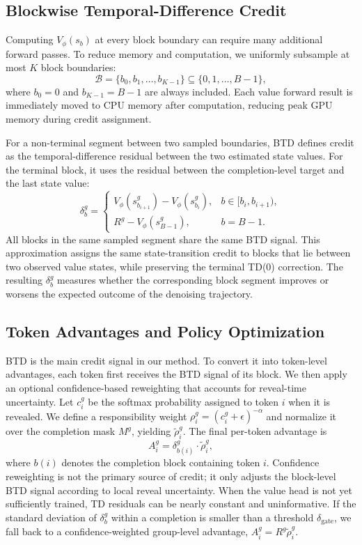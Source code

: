 \documentclass[letterpaper]{article}
\begin{document}
\subsection{Blockwise Temporal-Difference Credit}

Computing $V_\phi(s_b)$ at every block boundary can require many additional forward passes. To reduce memory and computation, we uniformly subsample at most $K$ block boundaries:
\begin{equation}
 \mathcal{B}=\{b_0,b_1,\ldots,b_{K-1}\}\subseteq\{0,1,\ldots,B-1\},
\end{equation}
where $b_0=0$ and $b_{K-1}=B-1$ are always included. Each value forward result is immediately moved to CPU memory after computation, reducing peak GPU memory during credit assignment.

For a non-terminal segment between two sampled boundaries, BTD defines credit as the temporal-difference residual between the two estimated state values. For the terminal block, it uses the residual between the completion-level target and the last state value:
\begin{equation}
\delta_b^g =
\left\{
\begin{array}{ll}
V_\phi(s_{b_{i+1}}^g)-V_\phi(s_{b_i}^g), &
 b\in [b_i,b_{i+1}),\\
R^g-V_\phi(s_{B-1}^g), & b=B-1.
\end{array}
\right.
\end{equation}
All blocks in the same sampled segment share the same BTD signal. This approximation assigns the same state-transition credit to blocks that lie between two observed value states, while preserving the terminal TD(0) correction. The resulting $\delta_b^g$ measures whether the corresponding block segment improves or worsens the expected outcome of the denoising trajectory.

\subsection{Token Advantages and Policy Optimization}

BTD is the main credit signal in our method. To convert it into token-level advantages, each token first receives the BTD signal of its block. We then apply an optional confidence-based reweighting that accounts for reveal-time uncertainty. Let $c_i^g$ be the softmax probability assigned to token $i$ when it is revealed. We define a responsibility weight $\rho_i^g=(c_i^g+\epsilon)^{-\alpha}$ and normalize it over the completion mask $M^g$, yielding $\tilde{\rho}_i^g$. The final per-token advantage is
\begin{equation}
 A_i^g = \delta_{b(i)}^g \cdot \tilde{\rho}_i^g,
\end{equation}
where $b(i)$ denotes the completion block containing token $i$. Confidence reweighting is not the primary source of credit; it only adjusts the block-level BTD signal according to local reveal uncertainty. When the value head is not yet sufficiently trained, TD residuals can be nearly constant and uninformative. If the standard deviation of $\delta_b^g$ within a completion is smaller than a threshold $\delta_{\mathrm{gate}}$, we fall back to a confidence-weighted group-level advantage, $A_i^g=R^g\tilde{\rho}_i^g$.
\end{document}
